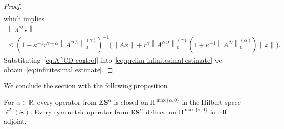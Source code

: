 \documentclass[AHL,Unicode,longabstracts,published]{cedram}
\renewcommand{\mathsf}{\mathrm}
\newcommand{\sfH}{\mathsf{H}}
\newcommand{\R}{\mathbb R}
\newcommand{\CD}{\mathcal{D}}
\newcommand{\CO}{\mathcal{O}}
\newcommand{\BE}{\mathbf E}
\newcommand{\BS}{\mathbf S}
\newcommand{\er}{r}
\begin{document}
\begin{proof}
\begin{align*}
\end{align*}
which implies
\begin{multline}\label{eq:A^CD control}
\left\|A^\CD x\right\|\\
\le \left(1 -\kappa^{-1}\er^{\gamma -\alpha}\left\|A^{\CO\CD}\right\|_0^{(\gamma)}\right)^{-1} \Big(\|A x\| +\er^\gamma\left\|A^{\CO\CD}\right\|_0^{(\gamma)}\left(1 +\kappa^{-1}\left\|A^\CD\right\|_0^{(\alpha)}\right)\|x\|\Big).
\end{multline}
Substituting~\eqref{eq:A^CD control} into~\eqref{eq:prelim infinitesimal estimate} we obtain~\eqref{eq:infinitesimal estimate}.
\end{proof}


We conclude the section with the following proposition.

\begin{prop}\label{prop:closedness and self-adjointness}
For $\alpha \in\R$, every operator from $\BE\BS^\alpha$ is closed on $\sfH^{\max\{\alpha, 0\}}$ in the Hilbert space $\ell^2(\Xi)$. Every symmetric operator from $\BE\BS^\alpha$ defined on $\sfH^{\max\{\alpha, 0\}}$ is self-adjoint.
\end{prop}
\end{document}
